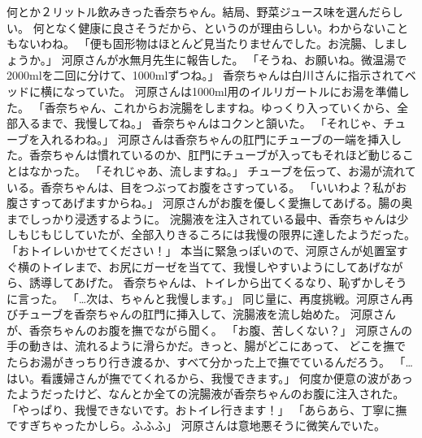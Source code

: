 何とか２リットル飲みきった香奈ちゃん。結局、野菜ジュース味を選んだらしい。
何となく健康に良さそうだから、というのが理由らしい。わからないこともないわね。
「便も固形物はほとんど見当たりませんでした。お浣腸、しましょうか。」
河原さんが水無月先生に報告した。
「そうね、お願いね。微温湯で2000mlを二回に分けて、1000mlずつね。」
香奈ちゃんは白川さんに指示されてベッドに横になっていた。
河原さんは1000ml用のイルリガートルにお湯を準備した。
「香奈ちゃん、これからお浣腸をしますね。ゆっくり入っていくから、全部入るまで、我慢してね。」
香奈ちゃんはコクンと頷いた。
「それじゃ、チューブを入れるわね。」
河原さんは香奈ちゃんの肛門にチューブの一端を挿入した。香奈ちゃんは慣れているのか、肛門にチューブが入ってもそれほど動じることはなかった。
「それじゃあ、流しますね。」
チューブを伝って、お湯が流れている。香奈ちゃんは、目をつぶってお腹をさすっている。
「いいわよ？私がお腹さすってあげますからね。」
河原さんがお腹を優しく愛撫してあげる。腸の奥までしっかり浸透するように。
浣腸液を注入されている最中、香奈ちゃんは少しもじもじしていたが、全部入りきるころには我慢の限界に達したようだった。
「おトイレいかせてください！」
本当に緊急っぽいので、河原さんが処置室すぐ横のトイレまで、お尻にガーゼを当てて、我慢しやすいようにしてあげながら、誘導してあげた。
香奈ちゃんは、トイレから出てくるなり、恥ずかしそうに言った。
「…次は、ちゃんと我慢します。」
同じ量に、再度挑戦。河原さん再びチューブを香奈ちゃんの肛門に挿入して、浣腸液を流し始めた。
河原さんが、香奈ちゃんのお腹を撫でながら聞く。
「お腹、苦しくない？」
河原さんの手の動きは、流れるように滑らかだ。きっと、腸がどこにあって、
どこを撫でたらお湯がきっちり行き渡るか、すべて分かった上で撫でているんだろう。
「…はい。看護婦さんが撫でてくれるから、我慢できます。」
何度か便意の波があったようだったけど、なんとか全ての浣腸液が香奈ちゃんのお腹に注入された。
「やっぱり、我慢できないです。おトイレ行きます！」
「あらあら、丁寧に撫ですぎちゃったかしら。ふふふ」
河原さんは意地悪そうに微笑んでいた。

